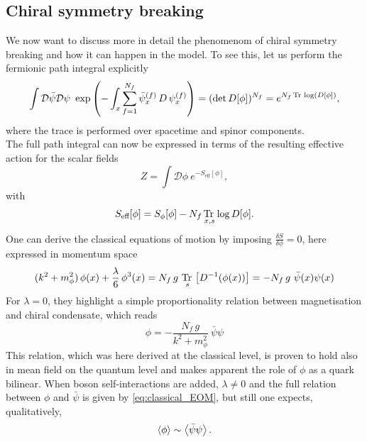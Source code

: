 \subsection{Chiral symmetry breaking}
We now want to discuss more in detail the phenomenom of chiral symmetry breaking and how it can happen in the model. To see this, let us perform the fermionic path integral explicitly
\begin{equation*}
    \int \mathcal{D} \bar\psi \mathcal{D} \psi \ \exp\left( - \int_x \sum_{f=1}^{N_f} \bar\psi_x^{(f)} \,  D \, \psi_x^{(f)} \right) = (\text{det} \, D[\phi])^{N_f} = e^{N_f\tr \log (D[\phi])},
\end{equation*}
where the trace is performed over spacetime and spinor components. \\ 
The full path integral can now be expressed in terms of the resulting effective action for the scalar fields
\begin{equation*}
    Z = \int \mathcal{D}\phi \ e^{-S_\text{eff}[\phi]},
\end{equation*}
with
\begin{equation}
    S_\text{eff}[\phi] = S_{\phi}[\phi] - N_f \, \underset{x,s}{\operatorname{\text{Tr} \,}} \log D[\phi].
    \label{eq:effective_action_no_fermions}
\end{equation}
One can derive the classical equations of motion by imposing $\frac{\delta S}{\delta \phi} = 0$, here expressed in momentum space
\begin{equation}
     (k^2 + m_\phi^2) \, \phi(x) + \frac{\lambda}{6} \, \phi^3(x) = N_f \, g \ \underset{s}{\tr} \left[D^{-1}(\phi(x))\right] = - N_f \, g \ \bar\psi(x) \psi(x)
     \label{eq:classical_EOM_full}
\end{equation}
For $\lambda = 0$, they highlight a simple proportionality relation between magnetisation and chiral condensate, which reads
\begin{equation}
    \phi = - \frac{N_f \, g}{k^2 + m_\phi^2} \ \bar \psi\psi
    \label{eq:classical_EOM}
\end{equation}
This relation, which was here derived at the classical level, is proven to hold also in mean field on the quantum level \cite{Ayala2021QCDDescriptions} and makes apparent the role of $\phi$ as a quark bilinear. 
When boson self-interactions are added, $\lambda \neq 0$ and the full relation between $\phi$ and $\bar\psi$ is given by \eqref{eq:classical_EOM}, but still one expects, qualitatively,
\begin{equation}
    \left\langle \phi \right\rangle \sim \left\langle \bar\psi\psi \right\rangle.
    \label{eq:qualitative_relation_condensate_magnetisation}
\end{equation}
